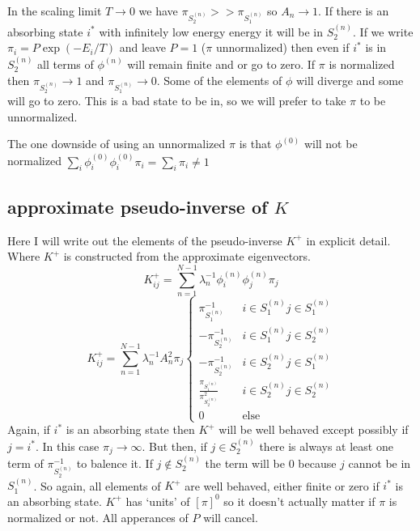 \documentclass[a4paper]{article}
\newcommand{\evec}[2]{\phi^{(#2)}_{#1}}
\begin{document}
In the scaling limit $T \to 0$ we have $\pi_{S_2^{(n)}} >> \pi_{S_1^{(n)}}$
so $A_n \to 1$.
If there is an absorbing state $i^*$ with infinitely low energy energy 
it will be in $S_2^{(n)}$.  
If we write $\pi_i = P \exp ( -E_i / T )$ and leave $P=1$ ($\pi$ unnormalized)
then even if $i^*$ is in $S_2^{(n)}$ all terms of $\evec{}{n}$ will remain finite and 
or go to zero.
If $\pi$ is normalized then $\pi_{S_2^{(n)}} \to 1$ and $\pi_{S_1^{(n)}} \to 0$.
Some of the elements of $\phi$ will diverge and some will go to zero.
This is a bad state to be in, so we will prefer to take $\pi$ to be unnormalized.

The one downside of using an unnormalized $\pi$ is that $\evec{}{0}$ will not be normalized
$\sum_i \evec{i}{0} \evec{i}{0} \pi_i = \sum_i \pi_i \neq 1$

\subsection{approximate pseudo-inverse of $K$}

Here I will write out the elements of the pseudo-inverse $K^{+}$ in explicit detail.
Where $K^+$ is constructed from the approximate eigenvectors.
\begin{equation}
  K^{+}_{ij} = \sum_{n=1}^{N-1} \lambda_n^{-1} \evec{i}{n} \evec{j}{n} \pi_j
\end{equation}
\begin{equation}
  K^{+}_{ij} = \sum_{n=1}^{N-1} \lambda_n^{-1} A_n^2 \pi_j 
  \begin{cases}
    \pi_{S_1^{(n)}}^{-1} & i \in S^{(n)}_1  j \in S^{(n)}_1 \\
  - \pi_{S_2^{(n)}}^{-1} & i \in S^{(n)}_1 j \in S^{(n)}_2 \\
  - \pi_{S_2^{(n)}}^{-1} & i \in S^{(n)}_2 j \in S^{(n)}_1 \\
    \frac{\pi_{S_1^{(n)}}}{\pi_{S_2^{(n)}}^2} & i \in S^{(n)}_2 j \in S^{(n)}_2 \\
  0 & \text{else}
  \end{cases}
\end{equation}
Again, if $i^*$ is an absorbing state then $K^+$ will be well behaved except possibly if
$j = i^*$.  In this case $\pi_j  \to \infty$.   But then, if $j \in S_2^{(n)}$ there is always at least one
term of $\pi_{S_2^{(n)}}^{-1}$ to balence it.  If $j \notin S_2^{(n)}$ the term will be $0$ because 
$j$ cannot be in $S_1^{(n)}$.  So again, all elements of $K^{+}$ are well behaved,
either finite or zero if $i^*$ is an absorbing state.
$K^+$ has `units' of $[\pi]^0$ so it doesn't actually matter if $\pi$ is normalized or not.  
All apperances of $P$ will cancel.
\end{document}
